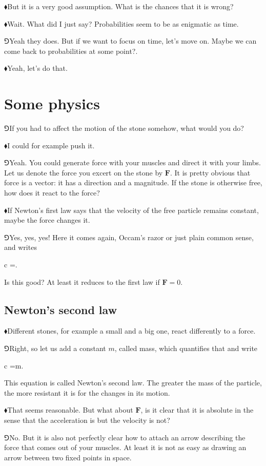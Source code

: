 \documentclass[11pt,oneside%
]{memoir}
\newenvironment{eqna}{\begin{IEEEeqnarray*}{c}}{\end{IEEEeqnarray*}\ignorespacesafterend}
\renewcommand{\vec}[1]{\mathbf{#1}}
\newcommand{\hea}{\(\blacklozenge\)\;}
\newcommand{\heb}{\(\Game\)\;}
\begin{document}
\hea But it is a very good assumption. What is the chances that it is wrong?

\hea Wait. What did I just say? Probabilities seem to be as enigmatic as time.

\heb Yeah they does. But if we want to focus on time, let's move on. Maybe we can come back to probabilities at some point?.

\hea Yeah, let's do that.
\chapter{Some physics}
\heb If you had to affect the motion of the stone somehow, what would you do?

\hea I could for example push it.

\heb Yeah. You could generate force with your muscles and direct it with your limbs. Let us denote the force you excert on the stone by \(\vec{F}\). It is pretty obvious that force is a vector: it has a direction and a magnitude. If the stone is otherwise free, how does it react to the force?

\hea If Newton's first law says that the velocity of the free particle remains constant, maybe the force changes it.

\heb Yes, yes, yes! Here it comes again, Occam's razor or just plain common sense, and writes
\begin{eqna}
    \vec{F}=\ddot{\vec{x}}.
\end{eqna}
Is this good? At least it reduces to the first law if \(\vec{F}=0\).
\section{Newton's second law}
\hea Different stones, for example a small and a big one, react differently to a force.

\heb Right, so let us add a constant \(m\), called mass, which quantifies that and write
\begin{eqna}
    \vec{F}=m\ddot{\vec{x}}.
\end{eqna}
This equation is called Newton's second law. The greater the mass of the particle, the more resistant it is for the changes in its motion.

\hea That seems reasonable. But what about \(\vec{F}\), is it clear that it is absolute in the sense that the acceleration is but the velocity is not?

\heb No. But it is also not perfectly clear how to attach an arrow describing the force that comes out of your muscles. At least it is not as easy as drawing an arrow between two fixed points in space.
\end{document}

